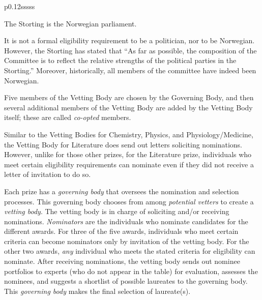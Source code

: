 \documentclass[11pt]{article}
\begin{document}
\begin{table}[t!]
\begin{threeparttable}
\begin{tabular}{p{}sssss}
\end{tabular}
\bigskip
\begin{tablenotes}
\item[1] The Storting is the Norwegian parliament.
\item[2] It is not a formal eligibility requirement to be a politician, nor to be Norwegian. However, the Storting has stated that ``As far as possible, the composition of the Committee is to reflect the relative strengths of the political parties in the Storting.'' Moreover, historically, all members of the committee have indeed been Norwegian.
\item[3] Five members of the Vetting Body are chosen by the Governing Body, and then several additional members of the Vetting Body are added by the Vetting Body itself; these are called \emph{co-opted} members.
\item[4] Similar to the Vetting Bodies for Chemistry, Physics, and Physiology/Medicine, the Vetting Body for Literature does send out letters soliciting nominations. However, unlike for those other prizes, for the Literature prize, individuals who meet certain eligibility requirements can nominate even if they did not receive a letter of invitation to do so.
\end{tablenotes}
\end{threeparttable}
\end{table}

Each prize has a \emph{governing body} that oversees the nomination and selection processes. This governing body chooses from among \emph{potential vetters} to create a \emph{vetting body}. The vetting body is in charge of soliciting and/or receiving nominations. \emph{Nominators} are the individuals who nominate candidates for the different awards.  For three of the five awards, individuals who meet certain criteria can become nominators only by invitation of the vetting body. For the other two awards, \emph{any} individual who meets the stated criteria for eligibility can nominate. After receiving nominations, the vetting body sends out nominee portfolios to experts (who do not appear in the table) for evaluation, assesses the nominees, and suggests a shortlist of possible laureates to the governing body. This \emph{governing body} makes the final selection of laureate(s).
\end{document}
